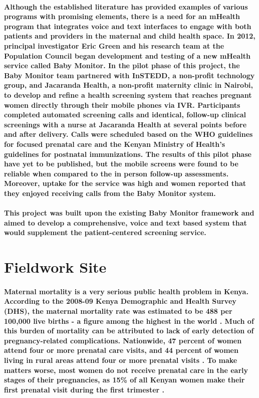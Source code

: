 \paragraph{Although the established literature has provided examples of various programs with promising elements, there is a need for an mHealth program that integrates voice and text interfaces to engage with both patients and providers in the maternal and child health space. In 2012, principal investigator Eric Green and his research team at the Population Council began development and testing of a new mHealth service called Baby Monitor. In the pilot phase of this project, the Baby Monitor team partnered with InSTEDD, a non-profit technology group, and Jacaranda Health, a non-profit maternity clinic in Nairobi, to develop and refine a health screening system that reaches pregnant women directly through their mobile phones via IVR. Participants completed automated screening calls and identical, follow-up clinical screenings with a nurse at Jacaranda Health at several points before and after delivery. Calls were scheduled based on the WHO guidelines for focused prenatal care and the Kenyan Ministry of Health's guidelines for postnatal immunizations. The results of this pilot phase have yet to be published, but the mobile screens were found to be reliable when compared to the in person follow-up assessments. Moreover, uptake for the service was high and women reported that they enjoyed receiving calls from the Baby Monitor system.}

\paragraph{This project was built upon the existing Baby Monitor framework and aimed to develop a comprehensive, voice and text based system that would supplement the patient-centered screening service.}


\section{Fieldwork Site}
\paragraph{Maternal mortality is a very serious public health problem in Kenya. According to the 2008-09 Kenya Demographic and Health Survey (DHS), the maternal mortality rate was estimated to be 488 per 100,000 live births - a figure among the highest in the world \citep{DHS2010}. Much of this burden of mortality can be attributed to lack of early detection of pregnancy-related complications. Nationwide, 47 percent of women attend four or more prenatal care visits, and 44 percent of women living in rural areas attend four or more prenatal visits \citep{DHS2010}. To make matters worse, most women do not receive prenatal care in the early stages of their pregnancies, as 15\% of all Kenyan women make their first prenatal visit during the first trimester \citep{DHS2010}.}

